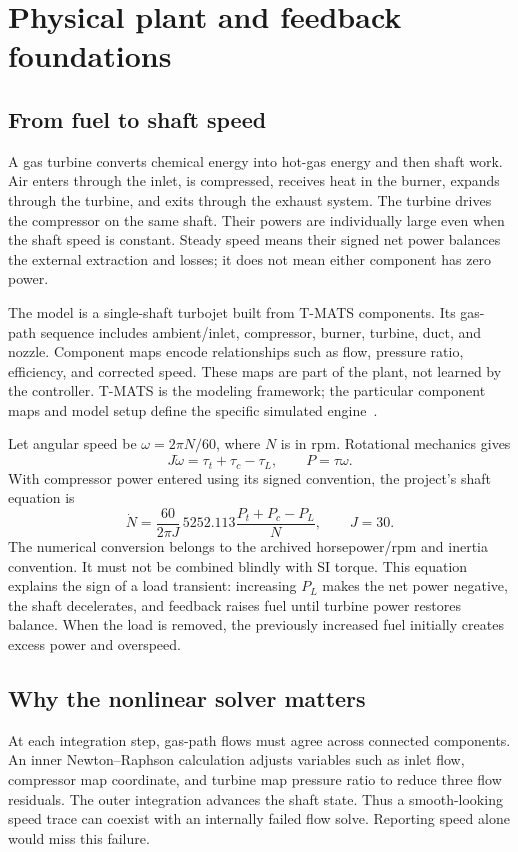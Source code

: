 \chapter{Physical plant and feedback foundations}
\section{From fuel to shaft speed}
A gas turbine converts chemical energy into hot-gas energy and then shaft work. Air enters through the inlet, is compressed, receives heat in the burner, expands through the turbine, and exits through the exhaust system. The turbine drives the compressor on the same shaft. Their powers are individually large even when the shaft speed is constant. Steady speed means their signed net power balances the external extraction and losses; it does not mean either component has zero power.

The model is a single-shaft turbojet built from T-MATS components. Its gas-path sequence includes ambient/inlet, compressor, burner, turbine, duct, and nozzle. Component maps encode relationships such as flow, pressure ratio, efficiency, and corrected speed. These maps are part of the plant, not learned by the controller. T-MATS is the modeling framework; the particular component maps and model setup define the specific simulated engine~\cite{tmatsguide}.

Let angular speed be $\omega=2\pi N/60$, where $N$ is in rpm. Rotational mechanics gives
\begin{equation}J\dot\omega=\tau_t+\tau_c-\tau_L,\qquad P=\tau\omega.
\end{equation}
With compressor power entered using its signed convention, the project's shaft equation is
\begin{equation}
\dot N=\frac{60}{2\pi J}\,5252.113\frac{P_t+P_c-P_L}{N},\qquad J=30.
\end{equation}
The numerical conversion belongs to the archived horsepower/rpm and inertia convention. It must not be combined blindly with SI torque. This equation explains the sign of a load transient: increasing $P_L$ makes the net power negative, the shaft decelerates, and feedback raises fuel until turbine power restores balance. When the load is removed, the previously increased fuel initially creates excess power and overspeed.

\section{Why the nonlinear solver matters}
At each integration step, gas-path flows must agree across connected components. An inner Newton--Raphson calculation adjusts variables such as inlet flow, compressor map coordinate, and turbine map pressure ratio to reduce three flow residuals. The outer integration advances the shaft state. Thus a smooth-looking speed trace can coexist with an internally failed flow solve. Reporting speed alone would miss this failure.

